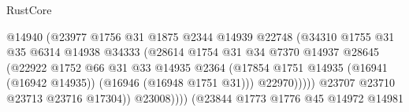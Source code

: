 \begin{lexlean}{RustCore}
\begin{coremodule}
                                              @14940
                                              (@23977
                                                @1756
                                                @31
                                                @1875
                                                @2344
                                                @14939
                                                @22748
                                                (@34310
                                                  @1755
                                                  @31
                                                  @35
                                                  @6314
                                                  @14938
                                                  @34333
                                                  (@28614
                                                    @1754
                                                    @31
                                                    @34
                                                    @7370
                                                    @14937
                                                    @28645
                                                    (@22922
                                                      @1752
                                                      @66
                                                      @31
                                                      @33
                                                      @14935
                                                      @2364
                                                      (@17854
                                                        @1751
                                                        @14935
                                                        (@16941 (@16942 @14935))
                                                        (@16946 (@16948 @1751 @31)))
                                                      @22970)))))
                                            @23707
                                            @23710
                                            @23713
                                            @23716
                                            @17304))
                                        @23008))))
                                (@23844
                                  @1773
                                  @1776
                                  @45
                                  @14972
                                  @14981

\end{coremodule}
\end{lexlean}
